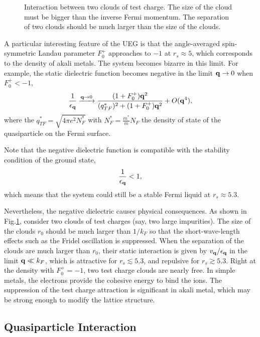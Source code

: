 \documentclass[reprint,amsmath,amssymb,aps,prb]{revtex4-1}
\begin{document}
\begin{figure}
    \centering
    \resizebox{1.0\linewidth}{!}{
        
    }
    \caption{Interaction between two clouds of test charge. The size of the cloud must be bigger than the inverse Fermi momentum. The separation of two clouds should be much larger than the size of the clouds.}
    \label{fig:test_charge}
\end{figure}


A particular interesting feature of the UEG is that the angle-averaged spin-symmetric Landau parameter $F_0^+$ approaches to $-1$ at $r_s \approx 5$, which corresponds to the density of akali metals. The system becomes bizarre in this limit. For example, the static dielectric function becomes negative in the limit $\mathbf{q} \rightarrow 0$ when $F_0^+<-1$,
\begin{equation}
    \frac{1}{\epsilon_{\mathbf{q}}} \xrightarrow{\mathbf{q} \rightarrow 0} \frac{(1+F_0^+)\mathbf{q}^2}{(q_{TF}^*)^2+(1+F_0^+)\mathbf{q}^2}+O(\mathbf{q}^4),
\end{equation}
where the $q_{TF}^*=\sqrt{4\pi e^2 N_F^*}$ with $N_F^*=\frac{m^*}{m}N_F$ the density of state of the quasiparticle on the Fermi surface.

Note that the negative dielectric function is compatible with the stability condition of the ground state\cite{dolgov},
\begin{equation}
    \frac{1}{\epsilon_{\mathbf{q}}}<1,
\end{equation}
which means that the system could still be a stable Fermi liquid at $r_s\approx 5.3$.

Nevertheless, the negative dielectric causes physical consequences. As shown in Fig.\ref{fig:test_charge}, consider two clouds of test charges (say, two large impurities). The size of the clouds $r_0$ should be much larger than $1/k_F$ so that the short-wave-length effects such as the Fridel oscillation is suppressed. When the separation of the clouds are much larger than $r_0$, their static interaction is given by $v_{\mathbf{q}}/\epsilon_{\mathbf{q}}$ in the limit $\mathbf{q} \ll k_F$, which is attractive for $r_s\lesssim 5.3$, and repulsive for $r_s \gtrsim 5.3$. Right at the density with $F_0^+=-1$, two test charge clouds are nearly free. In simple metals, the electrons provide the cohesive energy to bind the ions. The suppression of the test charge attraction is significant in akali metal, which may be strong enough to modify the lattice structure.

\subsection{Quasiparticle Interaction}
\end{document}
